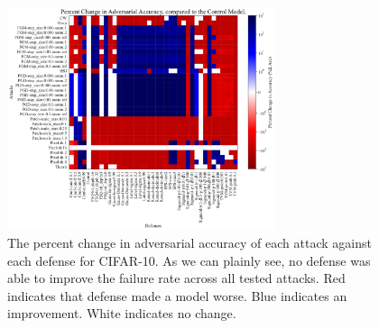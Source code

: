 \documentclass[journal]{IEEEtran}
\begin{document}
\begin{figure}[!ht]
    {\centering
    \includegraphics[trim={0 0.85em 0 0.4em},clip,width=0.7\textwidth]{images/cifar-10/acc_grid.pdf}
    \caption{The percent change in adversarial accuracy of each attack against each defense for CIFAR-10. As we can plainly see, no defense was able to improve the failure rate across all tested attacks. Red indicates that defense made a model worse. Blue indicates an improvement. White indicates no change.}
    \label{fig:adv_acc_grid}
    } %
\end{figure}
\end{document}
